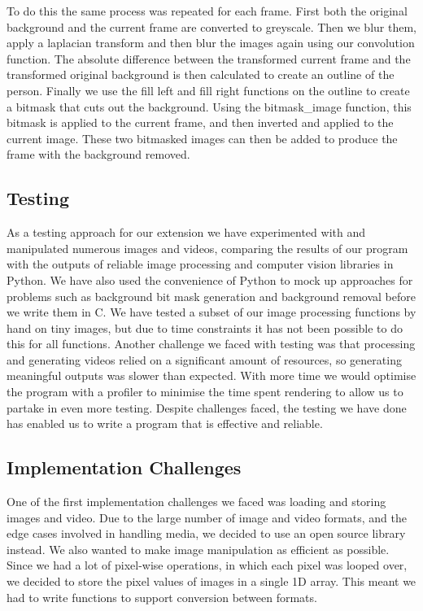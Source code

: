 \documentclass[11pt]{article}
\begin{document}
To do this the same process was repeated for each frame. First both the original background and the current frame are converted to greyscale. Then we blur them, apply a laplacian transform and then blur the images again using our convolution function. The absolute difference between the transformed current frame and the transformed original background is then calculated to create an outline of the person. Finally we use the fill left and fill right functions on the outline to create a bitmask that cuts out the background. Using the bitmask\_image function, this bitmask is applied to the current frame, and then inverted and applied to the current image. These two bitmasked images can then be added to produce the frame with the background removed. 

  \subsection*{Testing}
As a testing approach for our extension we have experimented with and manipulated numerous images and videos, comparing the results of our program with the outputs of reliable image processing and computer vision libraries in Python. We have also used the convenience of Python to mock up approaches for problems such as background bit mask generation and background removal before we write them in C. We have tested a subset of our image processing functions by hand on tiny images, but due to time constraints it has not been possible to do this for all functions. Another challenge we faced with testing was that processing and generating videos relied on a significant amount of resources, so generating meaningful outputs was slower than expected. With more time we would optimise the program with a profiler to minimise the time spent rendering to allow us to partake in even more testing.  Despite challenges faced, the testing we have done has enabled us to write a program that is effective and reliable.

  \subsection*{Implementation Challenges}
  One of the first implementation challenges we faced was loading and storing images and video. Due to the large number of image and video formats, and the edge cases involved in handling media, we decided to use an open source library instead. We also wanted to make image manipulation as efficient as possible. Since we had a lot of pixel-wise operations, in which each pixel was looped over, we decided to store the pixel values of images in a single 1D array. This meant we had to write functions to support conversion between formats.
\end{document}
